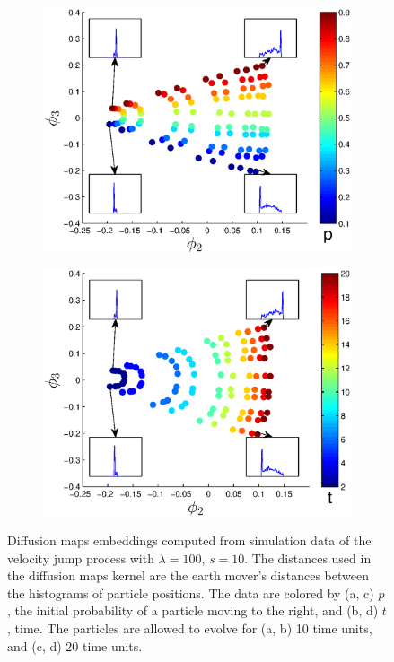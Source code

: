 \documentclass[prl, reprint, final, showkeys]{revtex4-1}
\begin{document}
\begin{figure}[t]
\begin{subfigure}{0.45\columnwidth}
\includegraphics[width=\textwidth]{EMD2_withhist_p_20}
\caption{}
\end{subfigure}
\begin{subfigure}{0.45\columnwidth}
\includegraphics[width=\textwidth]{EMD2_withhist_t_20}
\caption{}
\end{subfigure}
\caption{Diffusion maps embeddings computed from simulation data of the velocity jump process with $\lambda=100$, $s=10$. The distances used in the diffusion maps kernel are the earth mover's distances between the histograms of particle positions. The data are colored by (a, c) $p$, the initial probability of a particle moving to the right, and (b, d) $t$, time. The particles are allowed to evolve for (a, b) 10 time units, and (c, d) 20 time units.} 
\label{fig:dmaps_embed_varyt}
\end{figure}
\end{document}
